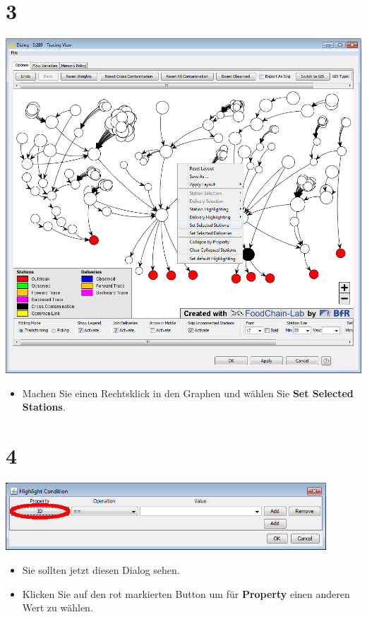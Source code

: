 \documentclass{beamer}
\begin{document}
\section{3}
\begin{frame}
	\begin{center}
  		\includegraphics[height=0.6\textheight]{3.png}
	\end{center}
	\begin{itemize}
		\item Machen Sie einen Rechtsklick in den Graphen und wählen Sie \textbf{Set Selected Stations}.
	\end{itemize}
\end{frame}

\section{4}
\begin{frame}
	\begin{center}
  		\includegraphics[width=0.9\textwidth]{4.png}
	\end{center}
	\begin{itemize}
		\item Sie sollten jetzt diesen Dialog sehen.
		\item Klicken Sie auf den rot markierten Button um für \textbf{Property} einen anderen Wert zu wählen.
	\end{itemize}
\end{frame}
\end{document}
